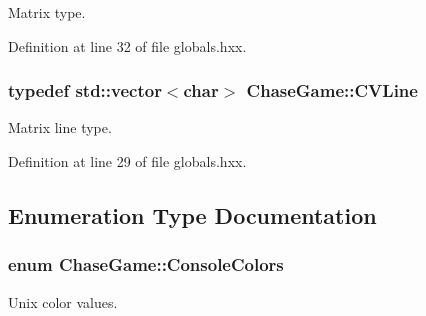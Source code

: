 Matrix type. 



Definition at line 32 of file globals.\-hxx.

\hypertarget{namespace_chase_game_aa09cf1806d3b1f59d36cfabadeaca6a2}{
\subsubsection[{C\-V\-Line}]{\setlength{\rightskip}{0pt plus 5cm}typedef std\-::vector$<$char$>$ {\bf Chase\-Game\-::\-C\-V\-Line}}}\label{namespace_chase_game_aa09cf1806d3b1f59d36cfabadeaca6a2}


Matrix line type. 



Definition at line 29 of file globals.\-hxx.



\subsection{Enumeration Type Documentation}
\hypertarget{namespace_chase_game_a5acdf639e912d1e78814b7fae21afc7b}{
\subsubsection[{Console\-Colors}]{\setlength{\rightskip}{0pt plus 5cm}enum {\bf Chase\-Game\-::\-Console\-Colors}}}\label{namespace_chase_game_a5acdf639e912d1e78814b7fae21afc7b}


Unix color values. 

